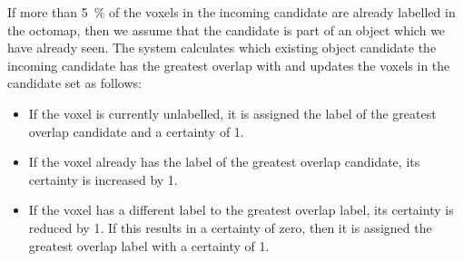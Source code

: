 If more than \SI{5}{\percent} of the voxels in the incoming candidate are already labelled in the octomap, then we assume that the candidate is part of an object which we have already seen.
The system calculates which existing object candidate the incoming candidate has the greatest overlap with and updates the voxels in the candidate set as follows:
\begin{itemize}
	\item If the voxel is currently unlabelled, it is assigned the label of the greatest overlap candidate and a certainty of \num{1}.
	\item If the voxel already has the label of the greatest overlap candidate, its certainty is increased by \num{1}.
	\item If the voxel has a different label to the greatest overlap label, its certainty is reduced by \num{1}. If this results in a certainty of zero, then it is assigned the greatest overlap label with a certainty of \num{1}.
\end{itemize}
